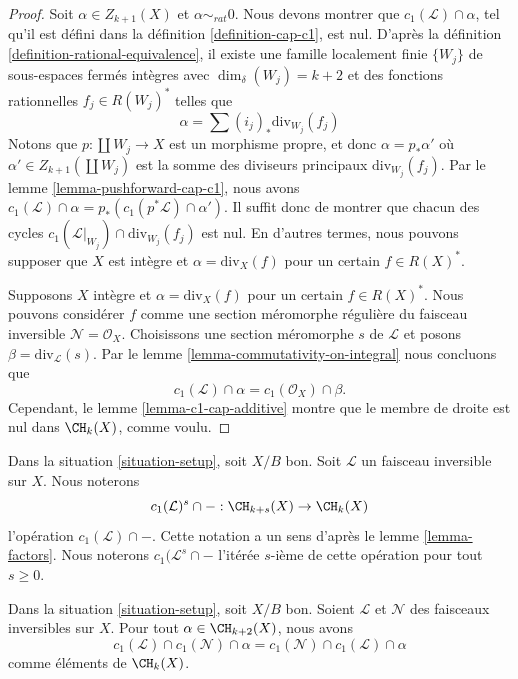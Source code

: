 \begin{proof}
Soit $\alpha \in Z_{k + 1}(X)$ et $\alpha \sim_{rat} 0$. Nous devons montrer
que $c_1(\mathcal{L}) \cap \alpha$, tel qu'il est défini dans la définition
\ref{definition-cap-c1}, est nul. D'après la définition
\ref{definition-rational-equivalence}, il existe une famille localement finie
$\{W_j\}$ de sous-espaces fermés intègres avec $\dim_\delta(W_j) = k + 2$ et
des fonctions rationnelles $f_j \in R(W_j)^*$ telles que
$$
\alpha = \sum (i_j)_*\text{div}_{W_j}(f_j)
$$
Notons que $p : \coprod W_j \to X$ est un morphisme propre, et donc $\alpha =
p_*\alpha'$ où $\alpha' \in Z_{k + 1}(\coprod W_j)$ est la somme des diviseurs
principaux $\text{div}_{W_j}(f_j)$. Par le lemme
\ref{lemma-pushforward-cap-c1}, nous avons $c_1(\mathcal{L}) \cap \alpha =
p_*(c_1(p^*\mathcal{L}) \cap \alpha')$. Il suffit donc de montrer que chacun des cycles
$c_1(\mathcal{L}|_{W_j}) \cap \text{div}_{W_j}(f_j)$ est nul. En d'autres
termes, nous pouvons supposer que $X$ est intègre et $\alpha =
\text{div}_X(f)$ pour un certain $f \in R(X)^*$.

\medskip\noindent
Supposons $X$ intègre et $\alpha = \text{div}_X(f)$ pour
un certain $f \in R(X)^*$. Nous pouvons considérer $f$ comme une section
méromorphe régulière du faisceau inversible $\mathcal{N} = \mathcal{O}_X$.
Choisissons une section méromorphe $s$ de $\mathcal{L}$ et posons $\beta =
\text{div}_\mathcal{L}(s)$. Par le lemme \ref{lemma-commutativity-on-integral}
nous concluons que
$$
c_1(\mathcal{L}) \cap \alpha = c_1(\mathcal{O}_X) \cap \beta.
$$
Cependant, le lemme \ref{lemma-c1-cap-additive} montre que le membre
de droite est nul dans $\CH_k(X)$, comme voulu.
\end{proof}

\noindent
Dans la situation \ref{situation-setup}, soit $X/B$ bon. Soit
$\mathcal{L}$ un faisceau inversible sur $X$. Nous noterons
$$
c_1(\mathcal{L})^s \cap - : \CH_{k + s}(X) \to \CH_k(X)
$$
l'opération $c_1(\mathcal{L}) \cap - $. Cette notation a un sens d'après le lemme
\ref{lemma-factors}. Nous noterons $c_1(\mathcal{L}^s \cap -$ l'itérée
$s$-ième de cette opération pour tout $s \geq 0$.

\begin{lemma}
\label{lemma-cap-commutative}
Dans la situation \ref{situation-setup}, soit $X/B$ bon. Soient
$\mathcal{L}$ et $\mathcal{N}$ des faisceaux inversibles sur $X$. Pour tout $\alpha \in \CH_{k
+ 2}(X)$, nous avons
$$
c_1(\mathcal{L}) \cap c_1(\mathcal{N}) \cap \alpha
=
c_1(\mathcal{N}) \cap c_1(\mathcal{L}) \cap \alpha
$$
comme éléments de $\CH_k(X)$.
\end{lemma}

